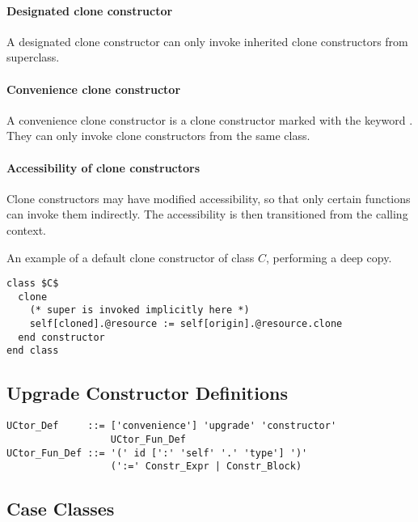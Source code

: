 \paragraph{Designated clone constructor}
A designated clone constructor can only invoke inherited clone constructors from superclass. 

\paragraph{Convenience clone constructor}
A convenience clone constructor is a clone constructor marked with the keyword . They can only invoke clone constructors from the same class. 

\paragraph{Accessibility of clone constructors}
Clone constructors may have modified accessibility, so that only certain functions can invoke them indirectly. The accessibility is then transitioned from the calling context. 

\example An example of a default clone constructor of class $C$, performing a deep copy. 
\begin{lstlisting}
class $C$
  clone
    (* super is invoked implicitly here *)
    self[cloned].@resource := self[origin].@resource.clone
  end constructor
end class
\end{lstlisting}





\subsection{Upgrade Constructor Definitions}
\label{sec:upgrade-def}

\syntax\begin{lstlisting}
UCtor_Def     ::= ['convenience'] 'upgrade' 'constructor' 
                  UCtor_Fun_Def
UCtor_Fun_Def ::= '(' id [':' 'self' '.' 'type'] ')'
                  (':=' Constr_Expr | Constr_Block)
\end{lstlisting}







\subsection{Case Classes}
\label{sec:case-classes}

